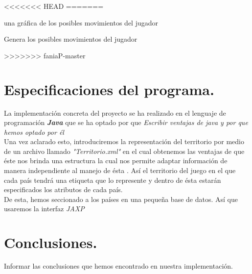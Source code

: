 \documentclass[12pt,twocolumn,draft]{article}
\begin{document}
<<<<<<< HEAD
=======

\begin{algorithm}
\begin{algorithmic}[1]
\ENSURE una gr\'afica de los posibles movimientos del jugador
\ELSE 
{}
\ENDIF
\ENDFOR
\end{algorithmic}
\caption{Genera los posibles movimientos del jugador}
\label{c3}
\end{algorithm}

>>>>>>> faniaP-master

\section{Especificaciones del programa.}

La implementaci\'on concreta del proyecto se ha realizado en el lenguaje de programaci\'on \textbf{\textit{Java}}\cite{JAVA} que se ha optado por que \textit{Escribir ventajas de java y por que hemos optado por \'el}\\

Una vez aclarado esto, introduciremos la representaci\'on del territorio por medio de un archivo llamado \textit{"Territorio.xml"} en el cual obtenemos las ventajas de que \'este nos brinda una estructura la cual nos permite adaptar informaci\'on de manera independiente al manejo de \'esta \cite{xml}. As\'i el territorio del juego en el que cada pa\'is tendr\'a una etiqueta que lo represente y dentro de \'esta estar\'an especificados los atributos de cada pa\'is.\\

De esta, hemos seccionado a los pa\'ises en una peque\~na base de datos. As\'i que usaremos la interfaz \textit{JAXP}\cite{JAXP}

\section{Conclusiones.}
Informar las conclusiones que hemos encontrado en nuestra implementaci\'on.\\


\newpage
	
{}
\end{document}
